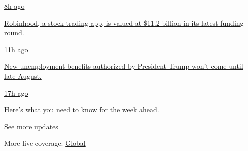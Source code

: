 \href{https://www.nytimes3xbfgragh.onion/live/2020/08/17/business/stock-market-today-coronavirus?action=click\&pgtype=Article\&state=default\&region=MAIN_CONTENT_1\&context=storylines_live_updates\#robinhood-a-stock-trading-app-is-valued-at-11-2-billion-in-its-latest-funding-round}{8h
ago}

\href{https://www.nytimes3xbfgragh.onion/live/2020/08/17/business/stock-market-today-coronavirus?action=click\&pgtype=Article\&state=default\&region=MAIN_CONTENT_1\&context=storylines_live_updates\#robinhood-a-stock-trading-app-is-valued-at-11-2-billion-in-its-latest-funding-round}{Robinhood,
a stock trading app, is valued at \$11.2 billion in its latest funding
round.}

\href{https://www.nytimes3xbfgragh.onion/live/2020/08/17/business/stock-market-today-coronavirus?action=click\&pgtype=Article\&state=default\&region=MAIN_CONTENT_1\&context=storylines_live_updates\#new-unemployment-benefits-authorized-by-president-trump-wont-come-until-late-august}{11h
ago}

\href{https://www.nytimes3xbfgragh.onion/live/2020/08/17/business/stock-market-today-coronavirus?action=click\&pgtype=Article\&state=default\&region=MAIN_CONTENT_1\&context=storylines_live_updates\#new-unemployment-benefits-authorized-by-president-trump-wont-come-until-late-august}{New
unemployment benefits authorized by President Trump won't come until
late August.}

\href{https://www.nytimes3xbfgragh.onion/live/2020/08/17/business/stock-market-today-coronavirus?action=click\&pgtype=Article\&state=default\&region=MAIN_CONTENT_1\&context=storylines_live_updates\#heres-what-you-need-to-know-for-the-week-ahead}{17h
ago}

\href{https://www.nytimes3xbfgragh.onion/live/2020/08/17/business/stock-market-today-coronavirus?action=click\&pgtype=Article\&state=default\&region=MAIN_CONTENT_1\&context=storylines_live_updates\#heres-what-you-need-to-know-for-the-week-ahead}{Here's
what you need to know for the week ahead.}

\href{https://www.nytimes3xbfgragh.onion/live/2020/08/17/business/stock-market-today-coronavirus?action=click\&pgtype=Article\&state=default\&region=MAIN_CONTENT_1\&context=storylines_live_updates}{See
more updates}

More live coverage:
\href{https://www.nytimes3xbfgragh.onion/2020/08/17/world/coronavirus-covid.html?action=click\&pgtype=Article\&state=default\&region=MAIN_CONTENT_1\&context=storylines_live_updates}{Global}

